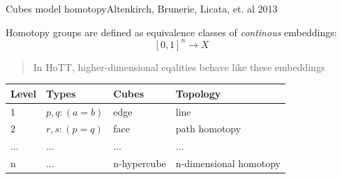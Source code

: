 \documentclass[english]{beamer}
\begin{document}
\begin{frame}{Cubes model homotopy}{Altenkirch, Brunerie, Licata, et. al 2013}
 
Homotopy groups are defined as equivalence classes of \emph{continous} embeddings:
$$[0,1]^n \rightarrow X$$

\begin{quotation}
In HoTT, higher-dimensional eqalities behave like these embeddings
\end{quotation}
\pause

    \begin{table}[]
        \begin{tabular}{@{}llll@{}}
        \toprule
        Level                & Types                & Cubes                 & Topology               \\ \midrule
        1                    & $p,q : (a = b)$        & edge                  & line                   \\
        2                    & $r,s : (p = q)$        & face                  & path homotopy          \\
        ... & ... & ... & ...   \\
        n                    & ... & n-hypercube           & n-dimensional homotopy \\ \bottomrule
        \end{tabular}
    \end{table}

%  
\end{frame}
\end{document}

